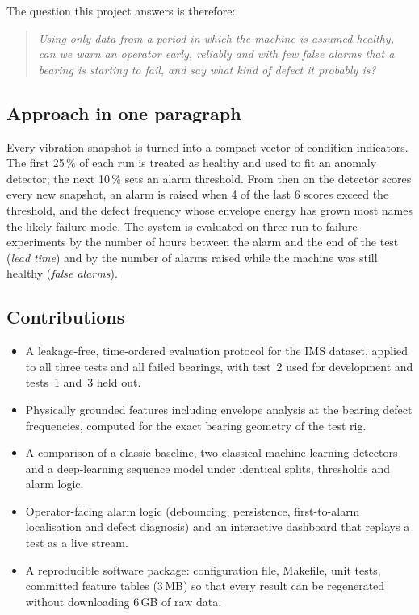 \documentclass[11pt]{article}
\begin{document}
The question this project answers is therefore:
\begin{quote}
\emph{Using only data from a period in which the machine is assumed healthy, can we warn an operator
early, reliably and with few false alarms that a bearing is starting to fail, and say what kind of
defect it probably is?}
\end{quote}

\subsection{Approach in one paragraph}
Every vibration snapshot is turned into a compact vector of condition indicators. The first 25\,\% of
each run is treated as healthy and used to fit an anomaly detector; the next 10\,\% sets an alarm
threshold. From then on the detector scores every new snapshot, an alarm is raised when 4 of the last
6 scores exceed the threshold, and the defect frequency whose envelope energy has grown most names the
likely failure mode. The system is evaluated on three run-to-failure experiments by the number of
hours between the alarm and the end of the test (\emph{lead time}) and by the number of alarms raised
while the machine was still healthy (\emph{false alarms}).

\subsection{Contributions}
\begin{itemize}
  \item A leakage-free, time-ordered evaluation protocol for the IMS dataset, applied to all three
        tests and all failed bearings, with test~2 used for development and tests~1 and~3 held out.
  \item Physically grounded features including envelope analysis at the bearing defect frequencies,
        computed for the exact bearing geometry of the test rig.
  \item A comparison of a classic baseline, two classical machine-learning detectors and a
        deep-learning sequence model under identical splits, thresholds and alarm logic.
  \item Operator-facing alarm logic (debouncing, persistence, first-to-alarm localisation and defect
        diagnosis) and an interactive dashboard that replays a test as a live stream.
  \item A reproducible software package: configuration file, Makefile, unit tests, committed feature
        tables (3\,MB) so that every result can be regenerated without downloading 6\,GB of raw data.
\end{itemize}
\end{document}
